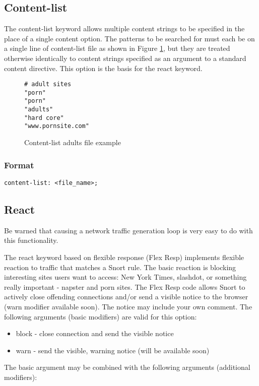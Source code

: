 \documentclass[english]{report}
\begin{document}
\subsection{Content-list}

The content-list keyword allows multiple content strings to be specified
in the place of a single content option. The patterns to be searched
for must each be on a single line of content-list file as shown in
Figure \ref{content-list example}, but they are treated otherwise
identically to content strings specified as an argument to a standard
content directive. This option is the basis for the react keyword.

%
\begin{figure}[!hbpt]
\begin{verbatim}
# adult sites 
"porn"
"porn"
"adults"
"hard core"
"www.pornsite.com"
\end{verbatim}
\caption{\label{content-list example}Content-list adults
file example}
\end{figure}



\subsubsection{Format}

\begin{verbatim}
content-list: <file_name>;
\end{verbatim}

\subsection{React}

Be warned that causing a network traffic generation loop is very easy
to do with this functionality.

The react keyword based on flexible response (Flex Resp) implements
flexible reaction to traffic that matches a Snort rule. The basic
reaction is blocking interesting sites users want to access: New York
Times, slashdot, or something really important - napster and porn
sites. The Flex Resp code allows Snort to actively close offending
connections and/or send a visible notice to the browser (warn modifier
available soon). The notice may include your own comment. The following
arguments (basic modifiers) are valid for this option:

\begin{itemize}
\item block - close connection and send the visible notice 
\item warn - send the visible, warning notice (will be available soon) 
\end{itemize}
The basic argument may be combined with the following arguments (additional
modifiers): 
\end{document}
